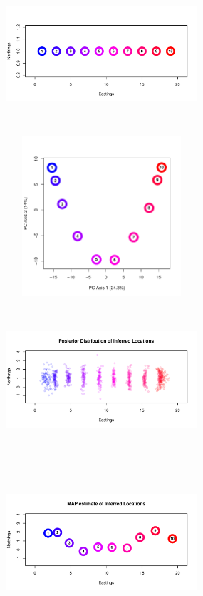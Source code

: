 \documentclass[12pt]{article}
\begin{document}
\begin{figure}
	\centering
			{\includegraphics[width=2.8in,height=2.33in]{figs/sims/line_pops_scenario.pdf}}
			{\includegraphics[width=2.8in,height=2.33in]{figs/sims/line_pops_PCA.pdf}}
			{\includegraphics[width=2.8in,height=2.33in]{figs/sims/line_pops_inference_post.pdf}}
			{\includegraphics[width=2.8in,height=2.33in]{figs/sims/line_pops_inference_MAP.pdf}}

\end{figure}
\end{document}
